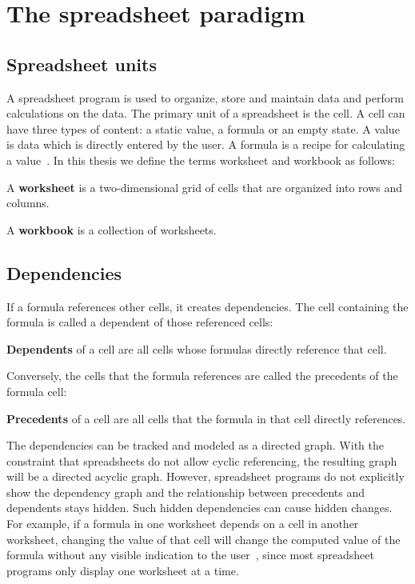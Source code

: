 \section{The spreadsheet paradigm}
\subsection{Spreadsheet units}
A spreadsheet program is used to organize, store and maintain data and perform calculations on the data. The primary unit of a spreadsheet is the cell. A cell can have three types of content: a static value, a formula or an empty state. A value is data which is directly entered by the user. A formula is a recipe for calculating a value~\cite[p.~18]{noauthor_ecma-376-12016_2016}. In this thesis we define the terms worksheet and workbook as follows:
\begin{definition}
    \label{def:Worksheet}
    A \textbf{worksheet} is a two-dimensional grid of cells that are organized into rows and columns.~\cite[p.~65]{noauthor_ecma-376-12016_2016}
\end{definition}
\begin{definition}
    \label{def:Workbook}
    A \textbf{workbook} is a collection of worksheets.~\cite[p.~65]{noauthor_ecma-376-12016_2016}
\end{definition}

\subsection{Dependencies}
If a formula references other cells, it creates dependencies. The cell containing the formula is called a dependent of those referenced cells:
\begin{definition}
    \label{def:dependents}
    \textbf{Dependents} of a cell are all cells whose formulas directly reference that cell.
\end{definition}
Conversely, the cells that the formula references are called the precedents of the formula cell:
\begin{definition}
    \label{def:precedents}
    \textbf{Precedents} of a cell are all cells that the formula in that cell directly references.
\end{definition}
The dependencies can be tracked and modeled as a directed graph. With the constraint that spreadsheets do not allow cyclic referencing, the resulting graph will be a directed acyclic graph. However, spreadsheet programs do not explicitly show the dependency graph and the relationship between precedents and dependents stays hidden. Such hidden dependencies can cause hidden changes. For example, if a formula in one worksheet depends on a cell in another worksheet, changing the value of that cell will change the computed value of the formula without any visible indication to the user~\cite{green_usability_1996}, since most spreadsheet programs only display one worksheet at a time.
